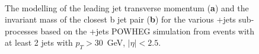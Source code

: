 \begin{figure}
\begin{centering}
 \\
\caption[Modelling of the \ttbar+X sub-processes]{The modelling of the leading jet transverse momentum (\textbf{a}) and the invariant mass of the closest b jet pair (\textbf{b}) for the various \ttbar+jets sub-processes based on the \ttbar+jets POWHEG simulation from events with at least 2 jets with $p_T > 30$~GeV, $|\eta| < 2.5$.}
\label{fig:tth_ttjets_subprocesses}
\end{centering}
\end{figure}

